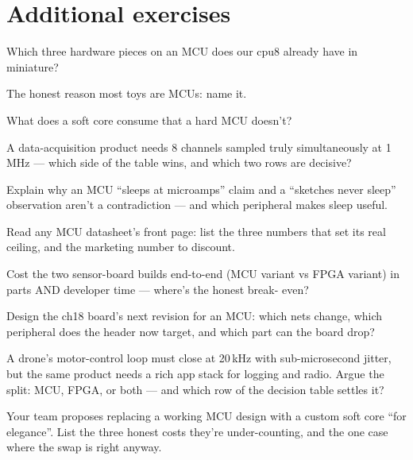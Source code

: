 \section*{Additional exercises}

\begin{exercise}[easy]
Which three hardware pieces on an MCU does our cpu8 already have
in miniature?
\end{exercise}
\begin{exercise}[easy]
The honest reason most toys are MCUs: name it.
\end{exercise}
\begin{exercise}[easy]
What does a soft core consume that a hard MCU doesn't?
\end{exercise}
\begin{exercise}[medium]
A data-acquisition product needs 8 channels sampled truly
simultaneously at 1\,MHz --- which side of the table wins, and
which two rows are decisive?
\end{exercise}
\begin{exercise}[medium]
Explain why an MCU ``sleeps at microamps'' claim and a ``sketches
never sleep'' observation aren't a contradiction --- and which
peripheral makes sleep useful.
\end{exercise}
\begin{exercise}[medium]
Read any MCU datasheet's front page: list the three numbers that
set its real ceiling, and the marketing number to discount.
\end{exercise}
\begin{exercise}[hard]
Cost the two sensor-board builds end-to-end (MCU variant vs FPGA
variant) in parts AND developer time --- where's the honest break-
even?
\end{exercise}
\begin{exercise}[hard]
Design the ch18 board's next revision for an MCU: which nets
change, which peripheral does the header now target, and which
part can the board drop?
\end{exercise}
\begin{exercise}[medium]
A drone's motor-control loop must close at 20\,kHz with
sub-microsecond jitter, but the same product needs a rich app
stack for logging and radio. Argue the split: MCU, FPGA, or
both --- and which row of the decision table settles it?
\end{exercise}
\begin{exercise}[medium]
Your team proposes replacing a working MCU design with a
custom soft core ``for elegance''. List the three honest costs
they're under-counting, and the one case where the swap is
right anyway.
\end{exercise}

